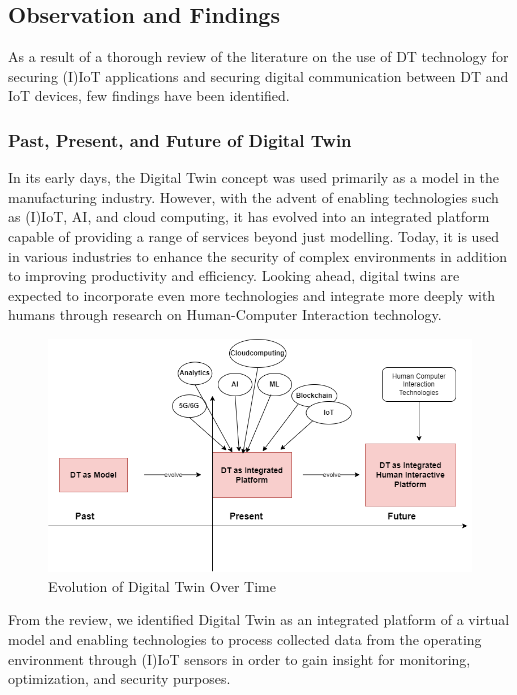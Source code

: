 \subsection{Observation and Findings}
As a result of a thorough review of the literature on the use of DT technology for securing (I)IoT applications and securing digital communication between DT and IoT devices, few findings have been identified.


\subsubsection*{Past, Present, and Future of Digital Twin}
In its early days, the Digital Twin concept was used primarily as a model in the manufacturing industry. However, with the advent of enabling technologies such as (I)IoT, AI, and cloud computing, it has evolved into an integrated platform capable of providing a range of services beyond just modelling. Today, it is used in various industries to enhance the security of complex environments in addition to improving productivity and efficiency. Looking ahead, digital twins are expected to incorporate even more technologies and integrate more deeply with humans through research on Human-Computer Interaction technology. 

\begin{figure}[H]
    \centering
    \includegraphics[width=\textwidth]{images/rt/dt-evolution.drawio.png}
    \caption{Evolution of Digital Twin Over Time}
    \label{fig:dt-evol}
\end{figure}


From the review, we identified Digital Twin as an integrated platform of a virtual model and enabling technologies to process collected data from the operating environment through (I)IoT sensors in order to gain insight for monitoring, optimization, and security purposes. 

